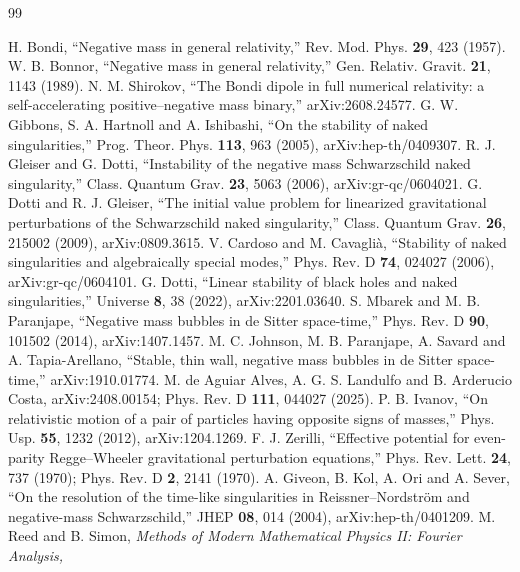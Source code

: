 \documentclass[11pt]{article}
\theoremstyle{remark}
\begin{document}
\begin{thebibliography}{99}

 H. Bondi, ``Negative mass in general relativity,'' Rev. Mod. Phys. \textbf{29}, 423 (1957).
 W. B. Bonnor, ``Negative mass in general relativity,'' Gen. Relativ. Gravit. \textbf{21}, 1143 (1989).
 N. M. Shirokov, ``The Bondi dipole in full numerical relativity: a self-accelerating
positive--negative mass binary,'' arXiv:2608.24577.
 G. W. Gibbons, S. A. Hartnoll and A. Ishibashi, ``On the stability of naked singularities,''
Prog. Theor. Phys. \textbf{113}, 963 (2005), arXiv:hep-th/0409307.
 R. J. Gleiser and G. Dotti, ``Instability of the negative mass Schwarzschild naked singularity,''
Class. Quantum Grav. \textbf{23}, 5063 (2006), arXiv:gr-qc/0604021.
 G. Dotti and R. J. Gleiser, ``The initial value problem for linearized gravitational perturbations of
the Schwarzschild naked singularity,'' Class. Quantum Grav. \textbf{26}, 215002 (2009), arXiv:0809.3615.
 V. Cardoso and M. Cavagli\`a, ``Stability of naked singularities and algebraically special modes,''
Phys. Rev. D \textbf{74}, 024027 (2006), arXiv:gr-qc/0604101.
 G. Dotti, ``Linear stability of black holes and naked singularities,'' Universe \textbf{8}, 38
(2022), arXiv:2201.03640.
 S. Mbarek and M. B. Paranjape, ``Negative mass bubbles in de Sitter space-time,'' Phys. Rev. D
\textbf{90}, 101502 (2014), arXiv:1407.1457.
 M. C. Johnson, M. B. Paranjape, A. Savard and A. Tapia-Arellano, ``Stable, thin wall, negative mass
bubbles in de Sitter space-time,'' arXiv:1910.01774.
 M. de Aguiar Alves, A. G. S. Landulfo and B. Arderucio Costa, arXiv:2408.00154; Phys. Rev. D
\textbf{111}, 044027 (2025).
 P. B. Ivanov, ``On relativistic motion of a pair of particles having opposite signs of
masses,'' Phys. Usp. \textbf{55}, 1232 (2012), arXiv:1204.1269.
 F. J. Zerilli, ``Effective potential for even-parity Regge--Wheeler gravitational perturbation
equations,'' Phys. Rev. Lett. \textbf{24}, 737 (1970); Phys. Rev. D \textbf{2}, 2141 (1970).
 A. Giveon, B. Kol, A. Ori and A. Sever, ``On the resolution of the time-like singularities in
Reissner--Nordstr\"om and negative-mass Schwarzschild,'' JHEP \textbf{08}, 014 (2004), arXiv:hep-th/0401209.
 M. Reed and B. Simon, \emph{Methods of Modern Mathematical Physics II: Fourier Analysis,
}
\end{thebibliography}
\end{document}

